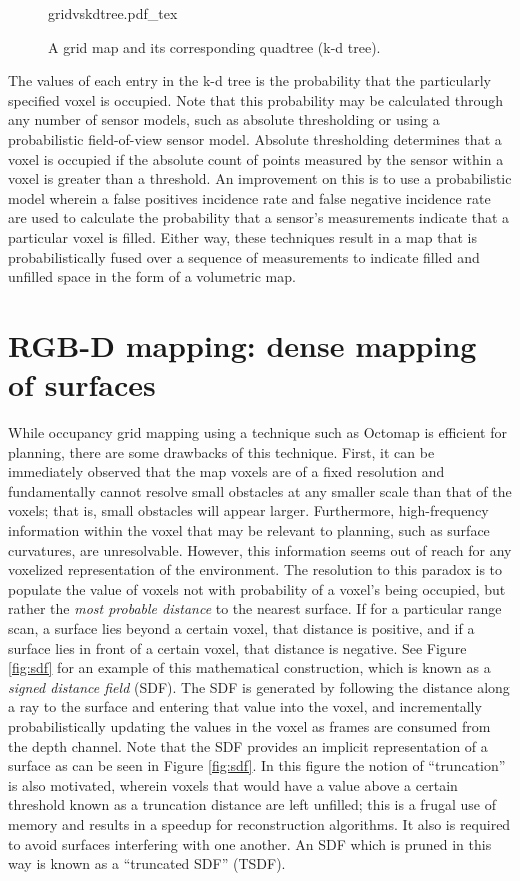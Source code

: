 \begin{figure}
    \centering
    \def\svgwidth{\textwidth}
    {gridvskdtree.pdf_tex}
    \caption{A grid map and its corresponding quadtree (k-d tree).\label{fig:gridvskdtree}}
\end{figure}

The values of each entry in the k-d tree is the probability that the particularly
specified voxel is occupied. Note that this probability may be calculated
through any number of sensor models, such as absolute thresholding or using a
probabilistic field-of-view sensor model. Absolute thresholding determines
that a voxel is occupied if the absolute count of points measured
by the sensor within a voxel is greater than a threshold. An improvement on this is
to use a probabilistic model wherein a false positives
incidence rate and false negative incidence rate are used to calculate the probability
that a sensor's measurements indicate that a particular voxel is filled. Either way,
these techniques result in a map that is probabilistically fused over a sequence of
measurements to indicate filled and unfilled space in the form of a volumetric map.


\section{RGB-D mapping: dense mapping of surfaces}
While occupancy grid mapping using a technique such as Octomap is efficient for
planning, there are some drawbacks of this technique. First, it can be
immediately observed that the map voxels are of a fixed resolution and
fundamentally cannot resolve small obstacles at any smaller scale than that of
the voxels; that is, small obstacles will appear larger. Furthermore,
high-frequency information within the voxel that may be relevant to planning,
such as surface curvatures, are unresolvable.  However, this information seems
out of reach for any voxelized representation of the environment. The
resolution to this paradox is to populate the value of voxels not with
probability of a voxel's being occupied, but rather the \emph{most probable
distance} to the nearest surface. If for a particular range scan, a surface
lies beyond a certain voxel, that distance is positive, and if a surface lies
in front of a certain voxel, that distance is negative. See Figure
\ref{fig:sdf} for an example of this mathematical construction, which is known
as a \emph{signed distance field} (SDF). The SDF is generated by following the
distance along a ray to the surface and entering that value into the voxel, and
incrementally probabilistically updating the values in the voxel as frames are
consumed from the depth channel.  Note that the SDF provides an implicit
representation of a surface as can be seen in Figure \ref{fig:sdf}. In this
figure the notion of ``truncation'' is also motivated, wherein voxels that
would have a value above a certain threshold known as a truncation distance are
left unfilled; this is a frugal use of memory and results in a speedup for
reconstruction algorithms. It also is required to avoid surfaces interfering
with one another.  An SDF which is pruned in this way is known as a ``truncated
SDF'' (TSDF).

